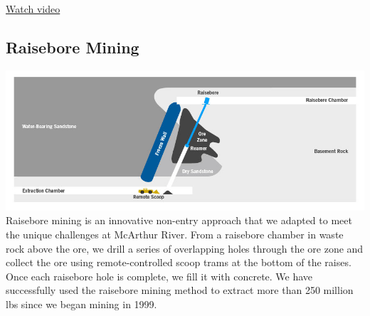 \href{https://www.cameco.com/businesses/mining-methods/in-situ-recovery-video}{Watch video}
\subsection*{Raisebore Mining}
\label{ssec:raisebore}
\includegraphics{img/cameco/3.0.1-4MiningMethods-Raisebore.jpg}
Raisebore mining is an innovative non-entry approach that we adapted to meet the unique challenges at McArthur River. From a raisebore chamber in waste rock above the ore, we drill a series of overlapping holes through the ore zone and collect the ore using remote-controlled scoop trams at the bottom of the raises. Once each raisebore hole is complete, we fill it with concrete. We have successfully used the raisebore mining method to extract more than 250 million lbs since we began mining in 1999.
